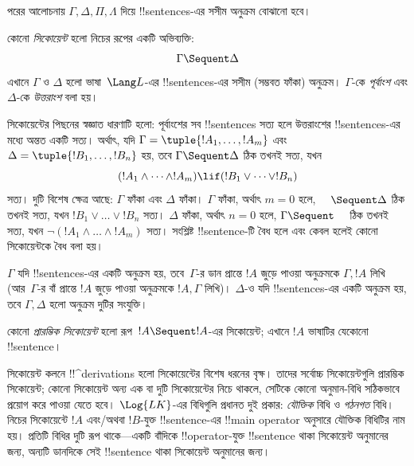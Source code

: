 \documentclass[../../../include/open-logic-section]{subfiles}
\begin{document}
      {}
      {}


পরের আলোচনায় $\Gamma, \Delta, \Pi, \Lambda$ দিয়ে !!{sentence}s-এর
সসীম অনুক্রম বোঝানো হবে।

\begin{defn}[সিকোয়েন্ট]
কোনো \emph{সিকোয়েন্ট} হলো নিচের রূপের একটি অভিব্যক্তি:
\[
\Gamma \Sequent \Delta
\]
এখানে $\Gamma$ ও $\Delta$ হলো ভাষা~$\Lang L$-এর !!{sentence}s-এর
সসীম (সম্ভবত ফাঁকা) অনুক্রম। $\Gamma$-কে \emph{পূর্বাংশ} এবং
$\Delta$-কে \emph{উত্তরাংশ} বলা হয়।
\end{defn}

\begin{explain}
সিকোয়েন্টের পিছনের স্বজ্ঞাত ধারণাটি হলো: পূর্বাংশের সব !!{sentence}s
সত্য হলে উত্তরাংশের !!{sentence}s-এর মধ্যে অন্তত একটি সত্য। অর্থাৎ, যদি
$\Gamma = \tuple{!A_1, \dots, !A_m}$ এবং
$\Delta = \tuple{!B_1, \dots, !B_n}$ হয়, তবে $\Gamma \Sequent \Delta$
ঠিক তখনই সত্য, যখন
\[
(!A_1 \land \cdots \land !A_m) \lif (!B_1 \lor \cdots \lor
!B_n)
\]
সত্য। দুটি বিশেষ ক্ষেত্র আছে: $\Gamma$ ফাঁকা এবং $\Delta$ ফাঁকা।
$\Gamma$ ফাঁকা, অর্থাৎ $m = 0$ হলে, $\quad
\Sequent \Delta$ ঠিক তখনই সত্য, যখন $!B_1 \lor \dots \lor !B_n$
সত্য। $\Delta$ ফাঁকা, অর্থাৎ $n = 0$ হলে, $\Gamma \Sequent \quad$
ঠিক তখনই সত্য, যখন $\lnot(!A_1 \land \dots \land !A_m)$ সত্য।
সংশ্লিষ্ট !!{sentence}-টি বৈধ হলে এবং কেবল হলেই কোনো সিকোয়েন্টকে
বৈধ বলা হয়।
\end{explain}

$\Gamma$ যদি !!{sentence}s-এর একটি অনুক্রম হয়, তবে~$\Gamma$-র ডান
প্রান্তে $!A$ জুড়ে পাওয়া অনুক্রমকে $\Gamma, !A$ লিখি (আর~$\Gamma$-র বাঁ প্রান্তে
$!A$ জুড়ে পাওয়া অনুক্রমকে $!A, \Gamma$ লিখি)। $\Delta$-ও যদি
!!{sentence}s-এর একটি অনুক্রম হয়, তবে $\Gamma, \Delta$ হলো অনুক্রম
দুটির সংযুক্তি।

\begin{defn}[প্রারম্ভিক সিকোয়েন্ট]
কোনো \emph{প্রারম্ভিক সিকোয়েন্ট} হলো
{রূপ~$!A \Sequent !A$-এর সিকোয়েন্ট}; এখানে $!A$ ভাষাটির যেকোনো
!!{sentence}।
\end{defn}

সিকোয়েন্ট কলনে !!^{derivation}s হলো সিকোয়েন্টের বিশেষ ধরনের বৃক্ষ।
তাদের সর্বোচ্চ সিকোয়েন্টগুলি প্রারম্ভিক সিকোয়েন্ট; কোনো সিকোয়েন্ট
অন্য এক বা দুটি সিকোয়েন্টের নিচে থাকলে, সেটিকে কোনো অনুমান-বিধি
সঠিকভাবে প্রয়োগ করে পাওয়া যেতে হবে। $\Log{LK}$-এর বিধিগুলি প্রধানত দুই প্রকার:
\emph{যৌক্তিক} বিধি ও \emph{গঠনগত} বিধি। নিচের সিকোয়েন্টে $!A$ এবং/অথবা
$!B$-যুক্ত !!{sentence}-এর !!{main operator} অনুসারে যৌক্তিক বিধিটির
নাম হয়। প্রতিটি বিধির দুটি রূপ থাকে—একটি বাঁদিকে !!{operator}-যুক্ত
!!{sentence} থাকা সিকোয়েন্ট অনুমানের জন্য, অন্যটি ডানদিকে সেই
!!{sentence} থাকা সিকোয়েন্ট অনুমানের জন্য।
\end{document}
